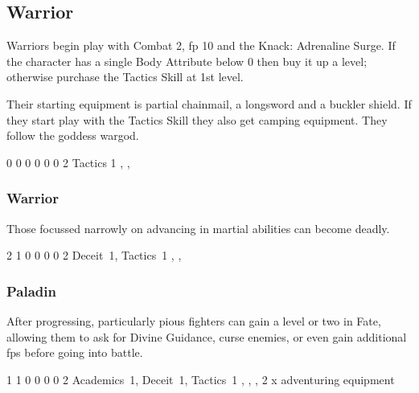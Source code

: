 \subsection{Warrior}

Warriors begin play with Combat 2, \gls{fp} 10 and the Knack: Adrenaline Surge.
If the character has a single Body Attribute below 0 then buy it up a level; otherwise purchase the Tactics Skill at 1st level.

Their starting equipment is partial chainmail, a longsword and a buckler shield.
If they start play with the Tactics Skill they also get camping equipment.
They follow the goddess \gls{wargod}.


{0}%
{0}%
{{0}%
{0}%
{0}}%
{0}%
{2}%
{Tactics 1\knacks{\adrenalinesurge}}%
{\longsword, \partialleather, \bucklar}%
{\addtocounter{fp}{5}}

\subsubsection{Warrior}

Those focussed narrowly on advancing in martial abilities can become deadly.


{2}%
{1}%
{{0}%
{0}%
{0}}%
{0}%
{2}%
{Deceit~1, Tactics~1\knacks{\adrenalinesurge, \charge, \firststrike}}%
{\longsword, \partialchain, \bucklar}%
{\addtocounter{fp}{5}}

\subsubsection{Paladin}

After progressing, particularly pious fighters can gain a level or two in Fate, allowing them to ask for Divine Guidance, curse enemies, or even gain additional \glspl{fp} before going into battle.


{1}%
{1}%
{{0}%
{0}%
{0}}%
{0}%
{2}%
{Academics~1, Deceit~1, Tactics~1
\knacks{\adrenalinesurge, \charge}}%
{\greatsword, \partialchain, \bucklar, 2 x adventuring equipment}%
{\addtocounter{fp}{10}}

